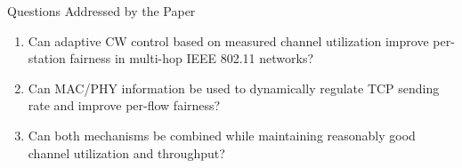 \begin{frame}{Questions Addressed by the Paper}

\begin{enumerate}
    \item Can adaptive CW control based on measured channel utilization improve per-station fairness in multi-hop IEEE 802.11 networks?

    \item Can MAC/PHY information be used to dynamically regulate TCP sending rate and improve per-flow fairness?

    \item Can both mechanisms be combined while maintaining reasonably good channel utilization and throughput?
\end{enumerate}
\end{frame}
